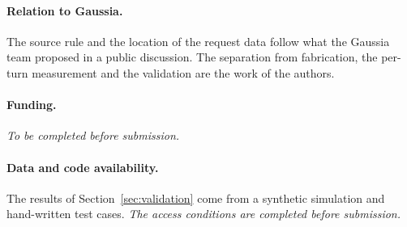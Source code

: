 \documentclass[11pt,a4paper]{article}
\begin{document}
\paragraph{Relation to Gaussia.} The source rule and the location of the request data follow what the Gaussia team
proposed in a public discussion. The separation from fabrication, the per-turn measurement and the validation are
the work of the authors.

\paragraph{Funding.} \textit{To be completed before submission.}

\paragraph{Data and code availability.} The results of Section~\ref{sec:validation} come from a synthetic
simulation and hand-written test cases. \textit{The access conditions are completed before submission.}



\end{document}
